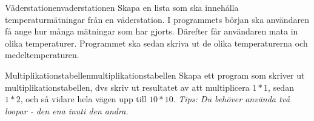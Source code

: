 \begin{matteovning}{Väderstationen}{vaderstationen}
Skapa en lista som ska innehålla temperaturmätningar från en väderstation. I programmets början ska användaren få ange hur många mätningar som har gjorts. Därefter får användaren mata in olika temperaturer. Programmet ska sedan skriva ut de olika temperaturerna och medeltemperaturen.
\end{matteovning}

\begin{matteovningm}{Multiplikationstabellen}{multiplikationstabellen}
Skapa ett program som skriver ut multiplikationstabellen, dvs skriv ut resultatet av att multiplicera $1*1$, sedan $1*2$, och så vidare hela vägen upp till $10*10$.
\newline
\newline
\emph{Tips: Du behöver använda två loopar - den ena inuti den andra.}
\end{matteovningm}
